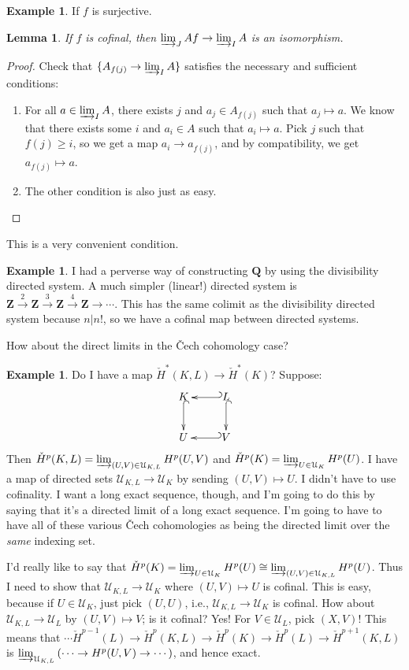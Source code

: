 \documentclass{amsart}
\theoremstyle{theorem}
\newtheorem{lemma}[theorem]{Lemma}
\theoremstyle{definition}
\newtheorem{example}[theorem]{Example}
\def\QQ{\mathbf Q}\def\RR{\mathbf R}\def\SS{\mathbb S}\def\TT{\mathbb T}
\newcommand\cHH{\check{H}}
\newcommand{\Z}{\mathbf Z}
\begin{document}
\begin{example}
If $f$ is surjective.
\end{example}
\begin{lemma}
If $f$ is cofinal, then $\varinjlim_{J}Af\to\varinjlim_{I}A$ is an isomorphism.
\end{lemma}
\begin{proof}
Check that $\{A_{f(j)}\to\varinjlim_{I}A\}$ satisfies the necessary and sufficient conditions:
\begin{enumerate}
\item For all $a\in\varinjlim_{I}A$, there exists $j$ and $a_j\in A_{f(j)}$ such that $a_j\mapsto a$. We know that there exists some $i$ and $a_i\in A$ such that $a_i\mapsto a$. Pick $j$ such that $f(j)\geq i$, so we get a map $a_i\to a_{f(j)}$, and by compatibility, we get $a_{f(j)}\mapsto a$.
\item The other condition is also just as easy.
\end{enumerate}
\end{proof}
This is a very convenient condition.
\begin{example}
I had a perverse way of constructing $\QQ$ by using the divisibility directed system. A much simpler (linear!) directed system is $\Z\xrightarrow{2}\Z\xrightarrow{3}\Z\xrightarrow{4}\Z\to\cdots$. This has the same colimit as the divisibility directed system because $n|n!$, so we have a cofinal map between directed systems.
\end{example}
How about the direct limits in the \v{C}ech cohomology case?
\begin{example}
Do I have a map $\cHH^\ast(K,L)\to\cHH^\ast(K)$? Suppose:
\begin{equation*}
\xymatrix{K\ar@{^(->}[d] & L\ar@{^(->}[d]\ar@{_(->}[l] \\ U & V\ar@{_(->}[l]}
\end{equation*}
Then $\cHH^p(K,L)=\varinjlim_{(U,V)\in\mathcal{U}_{K,L}}H^p(U,V)$ and $\cHH^p(K)=\varinjlim_{U\in\mathcal{U}_K}H^p(U)$. I have a map of directed sets $\mathcal{U}_{K,L}\to\mathcal{U}_K$ by sending $(U,V)\mapsto U$. I didn't have to use cofinality. I want a long exact sequence, though, and I'm going to do this by saying that it's a directed limit of a long exact sequence. I'm going to have to have all of these various \v{C}ech cohomologies as being the directed limit over the \emph{same} indexing set.

I'd really like to say that $\cHH^p(K)=\varinjlim_{U\in\mathcal{U}_K}H^p(U)\cong \varinjlim_{(U,V)\in\mathcal{U}_{K,L}}H^p(U)$. Thus I need to show that $\mathcal{U}_{K,L}\to\mathcal{U}_K$ where $(U,V)\mapsto U$ is cofinal. This is easy, because if $U\in\mathcal{U}_K$, just pick $(U,U)$, i.e., $\mathcal{U}_{K,L}\to\mathcal{U}_K$ is cofinal. How about $\mathcal{U}_{K,L}\to\mathcal{U}_L$ by $(U,V)\mapsto V$; is it cofinal? Yes! For $V\in\mathcal{U}_L$, pick $(X,V)$! This means that $\cdots\cHH^{p-1}(L)\to\cHH^p(K,L)\to\cHH^p(K)\to\cHH^p(L)\to\cHH^{p+1}(K,L)$ is $\varinjlim_{\mathcal{U}_{K,L}}\left(\cdots\to H^{p}(U,V)\to\cdots\right)$, and hence exact.
\end{example}
\end{document}
